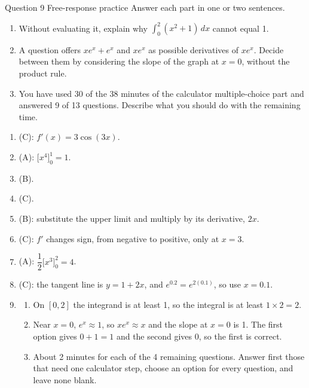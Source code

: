 \documentclass[11pt]{article}
\begin{document}
\begin{frbox}{Question 9 \textperiodcentered{} Free-response practice}
Answer each part in one or two sentences.
\begin{enumerate}[label=(\alph*),leftmargin=*,itemsep=2pt]
  \item Without evaluating it, explain why $\displaystyle\int_{0}^{2}(x^2+1)\,dx$ cannot equal 1.\work{2.6cm}
  \item A question offers $xe^{x}+e^{x}$ and $xe^{x}$ as possible derivatives of $xe^{x}$. Decide between them by considering the slope of the graph at $x=0$, without the product rule.\work{2.6cm}
  \item You have used 30 of the 38 minutes of the calculator multiple-choice part and answered 9 of 13 questions. Describe what you should do with the remaining time.\work{2.6cm}
\end{enumerate}
\end{frbox}

\newpage
\begin{solbox}
\begin{enumerate}[leftmargin=*,itemsep=4pt]
  \item (C): $f'(x)=3\cos(3x)$.
  \item (A): $\Big[x^4\Big]_0^1=1$.
  \item (B).
  \item (C).
  \item (B): substitute the upper limit and multiply by its derivative, $2x$.
  \item (C): $f'$ changes sign, from negative to positive, only at $x=3$.
  \item (A): $\dfrac12\Big[x^3\Big]_0^2=4$.
  \item (C): the tangent line is $y=1+2x$, and $e^{0.2}=e^{2(0.1)}$, so use $x=0.1$.
  \item \begin{enumerate}[label=(\alph*),leftmargin=*,itemsep=3pt]
    \item On $[0,2]$ the integrand is at least 1, so the integral is at least $1\times2=2$.
    \item Near $x=0$, $e^{x}\approx1$, so $xe^{x}\approx x$ and the slope at $x=0$ is 1. The first option gives $0+1=1$ and the second gives 0, so the first is correct.
    \item About 2 minutes for each of the 4 remaining questions. Answer first those that need one calculator step, choose an option for every question, and leave none blank.
  \end{enumerate}
\end{enumerate}
\end{solbox}
\end{document}
